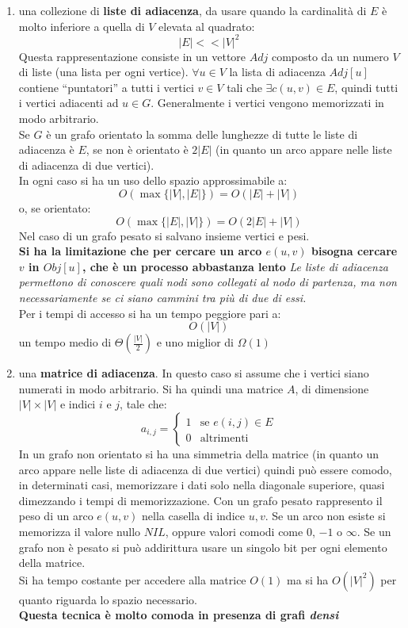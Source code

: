 \documentclass[a4paper,12pt, oneside]{book}
\begin{document}
\begin{enumerate}
  \item una collezione di \textbf{liste di adiacenza}, da usare quando la
  cardinalità di $E$ è molto inferiore a quella di $V$ elevata al
  quadrato:
  \[|E|<< |V|^2\]
  Questa rappresentazione consiste in un vettore $Adj$ composto da un
  numero $V$ di liste (una lista per ogni vertice). $\forall u\in V$
  la lista di adiacenza $Adj[u]$ contiene ``puntatori'' a tutti i
  vertici $v\in V$ tali che $\exists c(u,v)\in E$, quindi tutti i
  vertici adiacenti ad $u\in G$. Generalmente i vertici vengono
  memorizzati in modo arbitrario.\\
  Se $G$ è un grafo orientato la somma delle lunghezze di tutte le
  liste di adiacenza è $E$, se non è orientato è $2|E|$ (in quanto un
  arco appare nelle liste di adiacenza di due vertici).\\
  In ogni caso si ha un uso dello spazio approssimabile a:
  \[O(\max\{|V|,|E|\})=O(|E|+|V|)\]
  o, se orientato:
  \[O(\max\{|E|,|V|\})=O(2|E|+|V|)\]
  Nel caso di un grafo pesato si salvano insieme vertici e pesi.\\
  \textbf{Si ha la limitazione che per cercare un arco $e(u,v)$
    bisogna cercare $v$ in $Obj[u]$, che è un processo abbastanza
    lento}
  \textit{Le liste di adiacenza permettono di conoscere quali nodi
    sono collegati al nodo di partenza, ma non necessariamente se ci
    siano cammini tra più di due di essi.}\\
  Per i tempi di accesso si ha un tempo peggiore pari a:
  \[O(|V|)\]
  un tempo medio di $\Theta(\frac{|V|}{2})$ e uno miglior di $\Omega(1)$
  \item una \textbf{matrice di adiacenza}. In questo caso si assume
  che i vertici siano numerati in modo arbitrario. Si ha quindi una
  matrice $A$, di dimensione $|V|\times |V|$ e indici $i$ e $j$, tale
  che:
  \[a_{i,j}=
    \begin{cases}
      1 & \mbox{se } e(i,j)\in E\\
      0 & \mbox{altrimenti}
    \end{cases}
  \]
  In un grafo non orientato si ha una simmetria della matrice (in quanto un
  arco appare nelle liste di adiacenza di due vertici) quindi può
  essere comodo, in determinati casi, memorizzare i dati solo nella
  diagonale superiore, quasi dimezzando i tempi di memorizzazione. Con
  un grafo pesato rappresento il peso di un arco $e(u,v)$ nella
  casella di indice $u,v$. Se un arco non esiste si memorizza il
  valore nullo $NIL$, oppure valori comodi come $0$, $-1$ o $\infty$. Se un
  grafo non è pesato si può addirittura usare un singolo bit per ogni
  elemento della matrice.\\
  Si ha tempo costante per accedere alla matrice $O(1)$ ma si ha
  $O(|V|^2)$ per quanto riguarda lo spazio necessario.\\
  \textbf{Questa tecnica è molto comoda in presenza di grafi \textit{densi}}
\end{enumerate}
\end{document}
